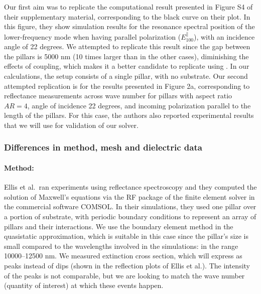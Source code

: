 Our first aim was to replicate the computational result presented in Figure S4 of their supplementary 
material, corresponding to the black curve on their plot. In this 
figure, they show simulation results for the resonance spectral position of the lower-frequency 
mode when having parallel polarization ($E^{\parallel}_{100}$), with an incidence angle of 22 degrees.
We attempted to replicate this result since the gap between the pillars 
is 5000 nm (10 times larger than in the other cases), diminishing the effects of coupling, which makes it 
a better candidate to replicate using \pygbe. 
In our calculations, the setup consists of a single pillar, with no substrate.
Our second attempted replication is  
for the results presented in Figure 2a, corresponding to reflectance measurements across wave number
for pillars with aspect ratio $AR=4$, angle of incidence 22 degrees, and incoming polarization parallel to the 
length of the pillars. For this case, the authors also reported experimental results that we will use for validation of our solver. 

\subsubsection{Differences in method, mesh and dielectric data}

\paragraph{Method:}
Ellis et al.\ ran experiments using reflectance spectroscopy and they computed the solution of
Maxwell's equations via the RF package of the finite element solver in the commercial software COMSOL. 
In their simulations, 
they used one pillar over a portion of substrate, with periodic boundary conditions to represent an array of 
pillars and their interactions. 
We use the boundary element method in the quasistatic approximation, which is suitable in this case 
since the pillar's size is small compared to the wavelengths involved in the simulations: 
in the range 10000--12500 nm. 
We measured extinction cross section, which will express as peaks instead of dips (shown in the reflection plots of Ellis et al.). 
The intensity of the peaks is not comparable, but we are looking to match the wave number (quantity of interest) at which these events happen. 

